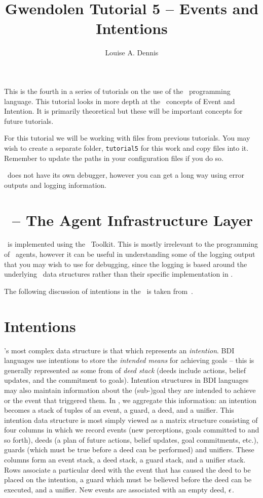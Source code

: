 \documentclass[a4]{article}
\author{Louise A. Dennis}
\title{Gwendolen Tutorial 5 -- Events and Intentions}
\begin{document}
\maketitle
This is the fourth in a series of tutorials on the use of the \gwendolen\ programming language.  This tutorial looks in more depth at the \gwendolen\ concepts of Event and Intention.  It is primarily theoretical but these will be important concepts for future tutorials.

For this tutorial we will be working with files from previous tutorials.  You may wish to create a separate folder, \texttt{tutorial5} for this work and copy files into it.  Remember to update the paths in your configuration files if you do so.

\gwendolen\ does not have its own debugger, however you can get a long way using error outputs and logging information.

\section{\ail\ -- The Agent Infrastructure Layer}

\gwendolen\ is implemented using the \ail\ Toolkit.  This is mostly irrelevant to the programming of \gwendolen\ agents, however it can be useful in understanding some of the logging output that you may wish to use for debugging, since the logging is based around the underlying \java\ data structures rather than their specific implementation in \gwendolen.

The following discussion of intentions in the \ail\ is taken from~\cite{springerlink:10.1007/s10515-011-0088-x}.

\section{Intentions}

\ail's most complex data structure is that which represents an
\emph{intention}.  BDI languages use intentions to
store the \emph{intended means} for achieving goals -- this is
generally represented as some from of {\em deed stack} (deeds include
actions, belief updates, and the commitment to
goals).  Intention structures in BDI languages may
also maintain information about the (sub-)goal they are intended to
achieve or the event that triggered them. In \ail, we aggregate
this information: an intention becomes a stack of tuples of an
event, a guard, a deed, and a
unifier.  This \ail{} intention data structure is most
simply viewed as a matrix structure consisting of four columns in
which we record events (new perceptions, goals committed to and so
forth), deeds (a plan of future actions, belief updates, goal
commitments, etc.), guards (which must be true before a deed can be
performed) and unifiers. These columns form an event stack, a deed
stack, a guard stack, and a unifier stack.  Rows associate a
particular deed with the event that has caused the deed to be placed
on the intention, a guard which must be believed before the deed can
be executed, and a unifier. New events are associated with an empty
deed, $\AILnpy$\index{$\AILnpy$}.
\end{document}
